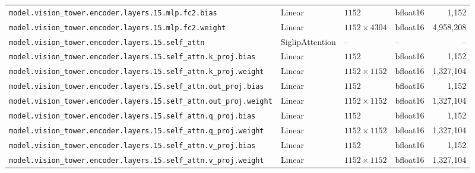 \documentclass[10pt,a4paper]{article}
\theoremstyle{definition}
\begin{document}
\begin{appendices}
{\begin{longtable}{p{6.8cm}>{\raggedright\arraybackslash}p{3.3cm}llr}
\texttt{model.\allowbreak{}vision\_tower.\allowbreak{}encoder.\allowbreak{}layers.\allowbreak{}15.\allowbreak{}mlp.\allowbreak{}fc2.\allowbreak{}bias} & Linear & $1152$ & bfloat16 & 1,152 \\
\texttt{model.\allowbreak{}vision\_tower.\allowbreak{}encoder.\allowbreak{}layers.\allowbreak{}15.\allowbreak{}mlp.\allowbreak{}fc2.\allowbreak{}weight} & Linear & $1152 \times 4304$ & bfloat16 & 4,958,208 \\
\texttt{model.\allowbreak{}vision\_tower.\allowbreak{}encoder.\allowbreak{}layers.\allowbreak{}15.\allowbreak{}self\_attn} & Siglip\allowbreak{}Attention & -- & -- & -- \\
\texttt{model.\allowbreak{}vision\_tower.\allowbreak{}encoder.\allowbreak{}layers.\allowbreak{}15.\allowbreak{}self\_attn.\allowbreak{}k\_proj.\allowbreak{}bias} & Linear & $1152$ & bfloat16 & 1,152 \\
\texttt{model.\allowbreak{}vision\_tower.\allowbreak{}encoder.\allowbreak{}layers.\allowbreak{}15.\allowbreak{}self\_attn.\allowbreak{}k\_proj.\allowbreak{}weight} & Linear & $1152 \times 1152$ & bfloat16 & 1,327,104 \\
\texttt{model.\allowbreak{}vision\_tower.\allowbreak{}encoder.\allowbreak{}layers.\allowbreak{}15.\allowbreak{}self\_attn.\allowbreak{}out\_proj.\allowbreak{}bias} & Linear & $1152$ & bfloat16 & 1,152 \\
\texttt{model.\allowbreak{}vision\_tower.\allowbreak{}encoder.\allowbreak{}layers.\allowbreak{}15.\allowbreak{}self\_attn.\allowbreak{}out\_proj.\allowbreak{}weight} & Linear & $1152 \times 1152$ & bfloat16 & 1,327,104 \\
\texttt{model.\allowbreak{}vision\_tower.\allowbreak{}encoder.\allowbreak{}layers.\allowbreak{}15.\allowbreak{}self\_attn.\allowbreak{}q\_proj.\allowbreak{}bias} & Linear & $1152$ & bfloat16 & 1,152 \\
\texttt{model.\allowbreak{}vision\_tower.\allowbreak{}encoder.\allowbreak{}layers.\allowbreak{}15.\allowbreak{}self\_attn.\allowbreak{}q\_proj.\allowbreak{}weight} & Linear & $1152 \times 1152$ & bfloat16 & 1,327,104 \\
\texttt{model.\allowbreak{}vision\_tower.\allowbreak{}encoder.\allowbreak{}layers.\allowbreak{}15.\allowbreak{}self\_attn.\allowbreak{}v\_proj.\allowbreak{}bias} & Linear & $1152$ & bfloat16 & 1,152 \\
\texttt{model.\allowbreak{}vision\_tower.\allowbreak{}encoder.\allowbreak{}layers.\allowbreak{}15.\allowbreak{}self\_attn.\allowbreak{}v\_proj.\allowbreak{}weight} & Linear & $1152 \times 1152$ & bfloat16 & 1,327,104 \\

\end{longtable}}
\end{appendices}
\end{document}
